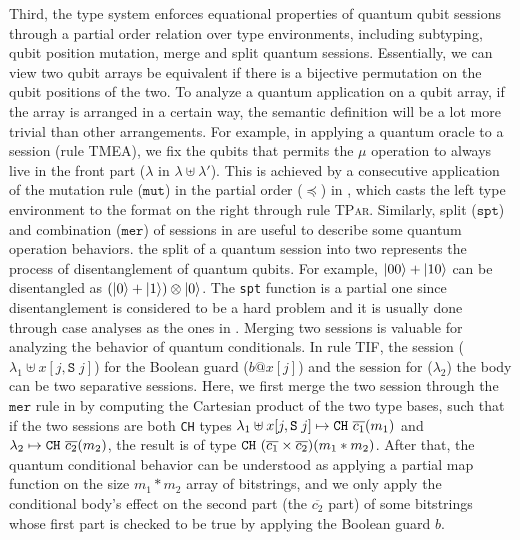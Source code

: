 Third, the type system enforces equational properties of 
quantum qubit sessions through a partial order relation over type environments, including subtyping, qubit position mutation, merge and split quantum sessions.
Essentially, we can view two qubit arrays be equivalent if there is a bijective permutation on the qubit positions of the two.
To analyze a quantum application on a qubit array, if the array is arranged in a certain way, the semantic definition will be a lot more trivial than other arrangements. For example, in applying a quantum oracle to a session (rule \textsc{TMEA}), we fix the qubits that permits the $\mu$ operation to always live in the front part ($\lambda$ in $\lambda\uplus\lambda'$).
This is achieved by a consecutive application of the mutation rule ($\texttt{mut}$) in the partial order ($\preceq$) in , which casts the left type environment to the format on the right through rule \textsc{TPar}.
Similarly, split ($\texttt{spt}$) and combination ($\texttt{mer}$) of sessions in  are useful to describe some quantum operation behaviors. the split of a quantum session into two represents the process of disentanglement of quantum qubits.
For example, $\left\vert{00}\right\rangle+\left\vert{10}\right\rangle$ can be disentangled as $(\left\vert{0}\right\rangle+\left\vert{1}\right\rangle)\otimes \left\vert{0}\right\rangle$.
The \texttt{spt} function is a partial one since disentanglement is considered to be a hard problem and it is usually done through case analyses as the ones in .
Merging two sessions is valuable for analyzing the behavior of quantum conditionals.
In rule \textsc{TIF}, the session ($\lambda_1\uplus x[j,\texttt{S}\;j]$) for the Boolean guard ($b@x[j]$)
 and the session for ($\lambda_2$) the body can be two separative sessions. 
Here, we first merge the two session through the $\texttt{mer}$ rule in  by computing the Cartesian product of the two type bases, such that if the two sessions are both \texttt{CH} types $\lambda_1\uplus x[j,\texttt{S}\;j]\mapsto\texttt{CH}~{\overline{c_1}(m_1)}$ and $\lambda_2\mapsto\texttt{CH}~{\overline{c_2}(m_2)}$, the result is of type $\texttt{CH}~{(\overline{c_1}\times \overline{c_2})(m_1*m_2)}$. 
After that, the quantum conditional behavior can be understood as applying a partial map function on the size $m_1*m_2$ array of bitstrings, and we only apply the conditional body's effect on the second part (the $\overline{c_2}$ part) of some bitstrings whose first part is checked to be true by applying the Boolean guard $b$. 
